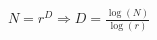 \documentclass[preview]{standalone}
\begin{document}
\begin{align*}
N = r^D \Rightarrow D = \frac{\log(N)}{\log(r)}
\end{align*}
\end{document}
